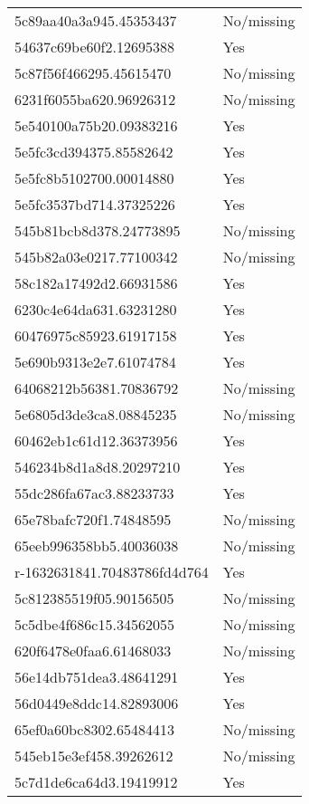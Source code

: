 \begin{tabular}{ll}
5c89aa40a3a945.45353437 & No/missing \\
54637c69be60f2.12695388 & Yes \\
5c87f56f466295.45615470 & No/missing \\
6231f6055ba620.96926312 & No/missing \\
5e540100a75b20.09383216 & Yes \\
5e5fc3cd394375.85582642 & Yes \\
5e5fc8b5102700.00014880 & Yes \\
5e5fc3537bd714.37325226 & Yes \\
545b81bcb8d378.24773895 & No/missing \\
545b82a03e0217.77100342 & No/missing \\
58c182a17492d2.66931586 & Yes \\
6230c4e64da631.63231280 & Yes \\
60476975c85923.61917158 & Yes \\
5e690b9313e2e7.61074784 & Yes \\
64068212b56381.70836792 & No/missing \\
5e6805d3de3ca8.08845235 & No/missing \\
60462eb1c61d12.36373956 & Yes \\
546234b8d1a8d8.20297210 & Yes \\
55dc286fa67ac3.88233733 & Yes \\
65e78bafc720f1.74848595 & No/missing \\
65eeb996358bb5.40036038 & No/missing \\
r-1632631841.70483786fd4d764 & Yes \\
5c812385519f05.90156505 & No/missing \\
5c5dbe4f686c15.34562055 & No/missing \\
620f6478e0faa6.61468033 & No/missing \\
56e14db751dea3.48641291 & Yes \\
56d0449e8ddc14.82893006 & Yes \\
65ef0a60bc8302.65484413 & No/missing \\
545eb15e3ef458.39262612 & No/missing \\
5c7d1de6ca64d3.19419912 & Yes \\
\bottomrule
\end{tabular}
